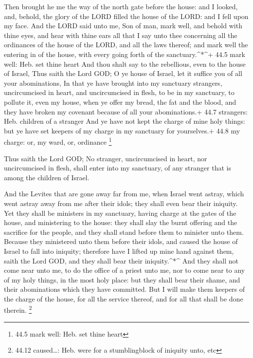  Then brought he me the way of the north gate before the
house: and I looked, and, behold, the glory of the LORD filled the house
of the LORD: and I fell upon my face.  And the LORD said
unto me, Son of man, mark well, and behold with thine eyes, and hear
with thine ears all that I say unto thee concerning all the ordinances
of the house of the LORD, and all the laws thereof; and mark well the
entering in of the house, with every going forth of the
sanctuary.\^{}*\^{}+ 44.5 mark well: Heb. set thine heart 
And thou shalt say to the rebellious, even to the house of Israel, Thus
saith the Lord GOD; O ye house of Israel, let it suffice you of all your
abominations,  In that ye have brought into my sanctuary
strangers, uncircumcised in heart, and uncircumcised in flesh, to be in
my sanctuary, to pollute it, even my house, when ye offer my bread, the
fat and the blood, and they have broken my covenant because of all your
abominations.+ 44.7 strangers: Heb. children of a stranger 
And ye have not kept the charge of mine holy things: but ye have set
keepers of my charge in my sanctuary for yourselves.+ 44.8 my charge:
or, my ward, or, ordinance \footnote{44.5 mark well: Heb. set thine
  heart}

 Thus saith the Lord GOD; No stranger, uncircumcised in
heart, nor uncircumcised in flesh, shall enter into my sanctuary, of any
stranger that is among the children of Israel.

 And the Levites that are gone away far from me, when
Israel went astray, which went astray away from me after their idols;
they shall even bear their iniquity.  Yet they shall be
ministers in my sanctuary, having charge at the gates of the house, and
ministering to the house: they shall slay the burnt offering and the
sacrifice for the people, and they shall stand before them to minister
unto them.  Because they ministered unto them before their
idols, and caused the house of Israel to fall into iniquity; therefore
have I lifted up mine hand against them, saith the Lord GOD, and they
shall bear their iniquity.\^{}*\^{}  And they shall not
come near unto me, to do the office of a priest unto me, nor to come
near to any of my holy things, in the most holy place: but they shall
bear their shame, and their abominations which they have committed.
 But I will make them keepers of the charge of the house,
for all the service thereof, and for all that shall be done therein.
\footnote{44.12 caused\ldots: Heb. were for a stumblingblock of iniquity
  unto, etc}

